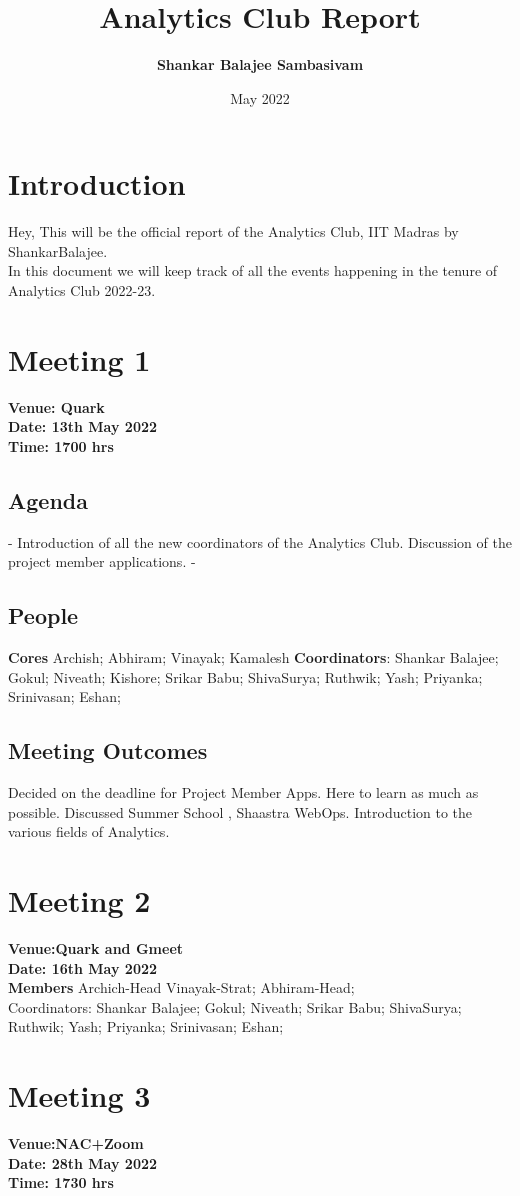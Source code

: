\documentclass[11pt]{scrartcl}
\title{\textbf{Analytics Club Report}}
\author{\textbf{Shankar Balajee Sambasivam}}
\date{May 2022}
\begin{document}
\dylantitle

\section{Introduction}
Hey, This will be the official report of the Analytics Club, IIT Madras by ShankarBalajee.\\
In this document we will keep track of all the events happening in the tenure of Analytics Club 2022-23.\\
\section{Meeting 1}
\textbf{Venue: Quark}\\
\textbf{Date: 13th May 2022}\\
\textbf{Time: 1700 hrs}\\
\subsection{Agenda}
- Introduction of all the new coordinators of the Analytics Club. Discussion of the project member applications.
- 
\subsection{People}
\textbf{Cores} Archish; Abhiram; Vinayak; Kamalesh
\textbf{Coordinators}:
Shankar Balajee;
Gokul;
Niveath;
Kishore;
Srikar Babu;
ShivaSurya;
Ruthwik;
Yash;
Priyanka;
Srinivasan;
Eshan;
\subsection{Meeting Outcomes}
Decided on the deadline for Project Member Apps. Here to learn as much as possible. Discussed Summer School , Shaastra WebOps. Introduction to the various fields of Analytics.
\section{Meeting 2}
\textbf{Venue:Quark and Gmeet}\\
\textbf{Date: 16th May 2022}\\
\textbf{Members}
Archich-Head
Vinayak-Strat;
Abhiram-Head;\\
Coordinators:
Shankar Balajee;
Gokul;
Niveath;
Srikar Babu;
ShivaSurya;
Ruthwik;
Yash;
Priyanka;
Srinivasan;
Eshan;

\section{Meeting 3}
\textbf{Venue:NAC+Zoom}\\
\textbf{Date: 28th May 2022}\\
\textbf{Time: 1730 hrs}\\
\end{document}
